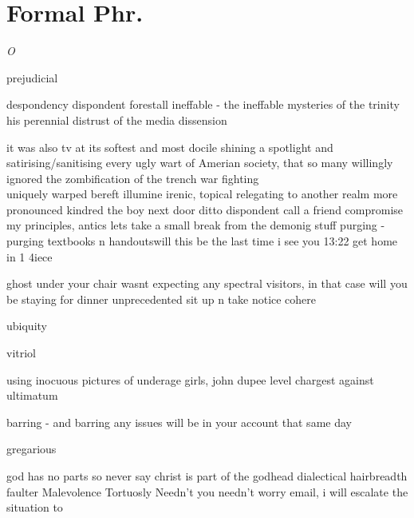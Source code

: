 \newpage

\section*{Formal Phr.}

\begin{multicols}{2}

\lettrine{\textit{O}}{} \\


\end{multicols}


prejudicial



despondency
dispondent
forestall
ineffable - the ineffable mysteries of the trinity
his perennial distrust of the media
dissension

it was also tv at its softest and most docile
shining a spotlight and satirising/sanitising every ugly wart of Amerian society, that so many willingly ignored
the zombification of the
trench war fighting\\
uniquely warped
bereft illumine irenic, topical relegating to another realm
more pronounced
kindred
the boy next door
ditto
dispondent
call a friend
compromise my principles, antics
lets take a small break from the demonig stuff
purging - purging textbooks n handoutswill this be the last time i see you
13:22
get home in 1 4iece


ghost under your chair
wasnt expecting any spectral visitors, in that case will you be staying for dinner
unprecedented
sit up n take notice
cohere

ubiquity

vitriol

using inocuous pictures of underage girls, john dupee
level chargest against
ultimatum

barring - and barring any issues will be in your account that same day

gregarious

god has no parts so never say christ is part of the godhead
dialectical
hairbreadth
faulter
Malevolence
Tortuosly
Needn't you needn't worry
email, i will escalate the situation to

